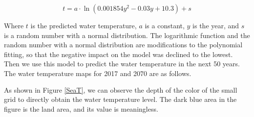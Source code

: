 \documentclass{mcmthesis}
\numberwithin{figure}{section}
\numberwithin{table}{section}
\begin{document}
\begin{equation}\label{2}
  t = a \cdot \ln (0.001854 y^2 - 0.03 y + 10.3) + s
  \end{equation}

Where $t$ is the predicted water temperature, $a$ is a constant, $y$ is the year, and $s$ is a random number with a normal distribution. The logarithmic function and the random number with a normal distribution are modifications to the polynomial fitting, so that the negative impact on the model was declined to the lowest. Then we use this model to predict the water temperature in the next 50 years. The water temperature maps for 2017 and 2070 are as follows.

As shown in Figure \ref{SeaT}, we can observe the depth of the color of the small grid to directly obtain the water temperature level. The dark blue area in the figure is the land area, and its value is meaningless.
\end{document}
